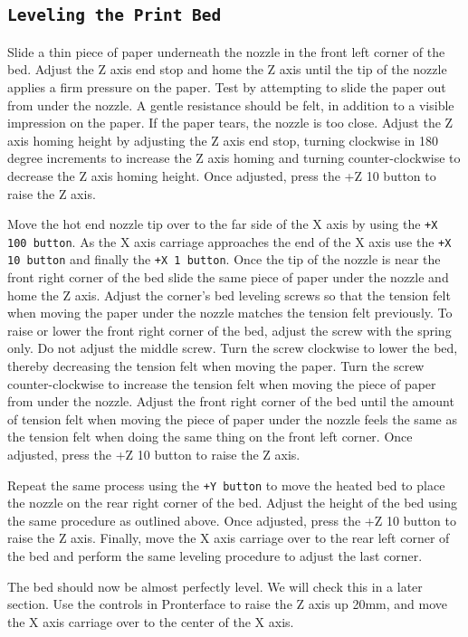 \subsection{\texttt{Leveling the Print Bed}}
Slide a thin piece of paper underneath the nozzle in the front left corner of the bed. Adjust the Z axis end stop and home the Z axis until the tip of the nozzle applies a firm pressure on the paper. Test by attempting to slide the paper out from under the nozzle. A gentle resistance should be felt, in addition to a visible impression on the paper. If the paper tears, the nozzle is too close. Adjust the Z axis homing height by adjusting the Z axis end stop, turning clockwise in 180 degree increments to increase the Z axis homing and turning counter-clockwise to decrease the Z axis homing height. Once adjusted, press the +Z 10 button to raise the Z axis.

Move the hot end nozzle tip over to the far side of the X axis by using the \texttt{+X 100 button}. As the X axis carriage approaches the end of the X axis use the \texttt{+X 10 button} and finally the \texttt{+X 1 button}. Once the tip of the nozzle is near the front right corner of the bed slide the same piece of paper under the nozzle and home the Z axis. Adjust the corner's bed leveling screws so that the tension felt when moving the paper under the nozzle matches the tension felt previously. To raise or lower the front right corner of the bed, adjust the screw with the spring only. Do not adjust the middle screw. Turn the screw clockwise to lower the bed, thereby decreasing the tension felt when moving the paper. Turn the screw counter-clockwise to increase the tension felt when moving the piece of paper from under the nozzle. Adjust the front right corner of the bed until the amount of tension felt when moving the piece of paper under the nozzle feels the same as the tension felt when doing the same thing on the front left corner. Once adjusted, press the +Z 10 button to raise the Z axis.

Repeat the same process using the \texttt{+Y button} to move the heated bed to place the nozzle on the rear right corner of the bed. Adjust the height of the bed using the same procedure as outlined above. Once adjusted, press the +Z 10 button to raise the Z axis. Finally, move the X axis carriage over to the rear left corner of the bed and perform the same leveling procedure to adjust the last corner.

The bed should now be almost perfectly level. We will check this in a later section. Use the controls in Pronterface to raise the Z axis up 20mm, and move the X axis carriage over to the center of the X axis.

